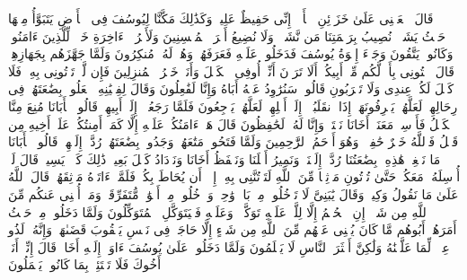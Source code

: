 \startbuffer[\q:12:55]
قَالَ ٱجۡعَلۡنِی عَلَىٰ خَزَاۤئِنِ ٱلۡأَرۡضِۖ إِنِّی حَفِیظٌ عَلِیمࣱ%
\stopbuffer
\startbuffer[\q:12:56]
وَكَذَٰلِكَ مَكَّنَّا لِیُوسُفَ فِی ٱلۡأَرۡضِ یَتَبَوَّأُ مِنۡهَا حَیۡثُ یَشَاۤءُۚ نُصِیبُ بِرَحۡمَتِنَا مَن نَّشَاۤءُۖ وَلَا نُضِیعُ أَجۡرَ ٱلۡمُحۡسِنِینَ%
\stopbuffer
\startbuffer[\q:12:57]
وَلَأَجۡرُ ٱلۡءَاخِرَةِ خَیۡرࣱ لِّلَّذِینَ ءَامَنُوا۟ وَكَانُوا۟ یَتَّقُونَ%
\stopbuffer
\startbuffer[\q:12:58]
وَجَاۤءَ إِخۡوَةُ یُوسُفَ فَدَخَلُوا۟ عَلَیۡهِ فَعَرَفَهُمۡ وَهُمۡ لَهُۥ مُنكِرُونَ%
\stopbuffer
\startbuffer[\q:12:59]
وَلَمَّا جَهَّزَهُم بِجَهَازِهِمۡ قَالَ ٱئۡتُونِی بِأَخࣲ لَّكُم مِّنۡ أَبِیكُمۡۚ أَلَا تَرَوۡنَ أَنِّیۤ أُوفِی ٱلۡكَیۡلَ وَأَنَا۠ خَیۡرُ ٱلۡمُنزِلِینَ%
\stopbuffer
\startbuffer[\q:12:60]
فَإِن لَّمۡ تَأۡتُونِی بِهِۦ فَلَا كَیۡلَ لَكُمۡ عِندِی وَلَا تَقۡرَبُونِ%
\stopbuffer
\startbuffer[\q:12:61]
قَالُوا۟ سَنُرَٰوِدُ عَنۡهُ أَبَاهُ وَإِنَّا لَفَٰعِلُونَ%
\stopbuffer
\startbuffer[\q:12:62]
وَقَالَ لِفِتۡیَٰنِهِ ٱجۡعَلُوا۟ بِضَٰعَتَهُمۡ فِی رِحَالِهِمۡ لَعَلَّهُمۡ یَعۡرِفُونَهَاۤ إِذَا ٱنقَلَبُوۤا۟ إِلَىٰۤ أَهۡلِهِمۡ لَعَلَّهُمۡ یَرۡجِعُونَ%
\stopbuffer
\startbuffer[\q:12:63]
فَلَمَّا رَجَعُوۤا۟ إِلَىٰۤ أَبِیهِمۡ قَالُوا۟ یَٰۤأَبَانَا مُنِعَ مِنَّا ٱلۡكَیۡلُ فَأَرۡسِلۡ مَعَنَاۤ أَخَانَا نَكۡتَلۡ وَإِنَّا لَهُۥ لَحَٰفِظُونَ%
\stopbuffer
\startbuffer[\q:12:64]
قَالَ هَلۡ ءَامَنُكُمۡ عَلَیۡهِ إِلَّا كَمَاۤ أَمِنتُكُمۡ عَلَىٰۤ أَخِیهِ مِن قَبۡلُ فَٱللَّهُ خَیۡرٌ حَٰفِظࣰاۖ وَهُوَ أَرۡحَمُ ٱلرَّٰحِمِینَ%
\stopbuffer
\startbuffer[\q:12:65]
وَلَمَّا فَتَحُوا۟ مَتَٰعَهُمۡ وَجَدُوا۟ بِضَٰعَتَهُمۡ رُدَّتۡ إِلَیۡهِمۡۖ قَالُوا۟ یَٰۤأَبَانَا مَا نَبۡغِیۖ هَٰذِهِۦ بِضَٰعَتُنَا رُدَّتۡ إِلَیۡنَاۖ وَنَمِیرُ أَهۡلَنَا وَنَحۡفَظُ أَخَانَا وَنَزۡدَادُ كَیۡلَ بَعِیرࣲۖ ذَٰلِكَ كَیۡلࣱ یَسِیرࣱ%
\stopbuffer
\startbuffer[\q:12:66]
قَالَ لَنۡ أُرۡسِلَهُۥ مَعَكُمۡ حَتَّىٰ تُؤۡتُونِ مَوۡثِقࣰا مِّنَ ٱللَّهِ لَتَأۡتُنَّنِی بِهِۦۤ إِلَّاۤ أَن یُحَاطَ بِكُمۡۖ فَلَمَّاۤ ءَاتَوۡهُ مَوۡثِقَهُمۡ قَالَ ٱللَّهُ عَلَىٰ مَا نَقُولُ وَكِیلࣱ%
\stopbuffer
\startbuffer[\q:12:67]
وَقَالَ یَٰبَنِیَّ لَا تَدۡخُلُوا۟ مِنۢ بَابࣲ وَٰحِدࣲ وَٱدۡخُلُوا۟ مِنۡ أَبۡوَٰبࣲ مُّتَفَرِّقَةࣲۖ وَمَاۤ أُغۡنِی عَنكُم مِّنَ ٱللَّهِ مِن شَیۡءٍۖ إِنِ ٱلۡحُكۡمُ إِلَّا لِلَّهِۖ عَلَیۡهِ تَوَكَّلۡتُۖ وَعَلَیۡهِ فَلۡیَتَوَكَّلِ ٱلۡمُتَوَكِّلُونَ%
\stopbuffer
\startbuffer[\q:12:68]
وَلَمَّا دَخَلُوا۟ مِنۡ حَیۡثُ أَمَرَهُمۡ أَبُوهُم مَّا كَانَ یُغۡنِی عَنۡهُم مِّنَ ٱللَّهِ مِن شَیۡءٍ إِلَّا حَاجَةࣰ فِی نَفۡسِ یَعۡقُوبَ قَضَىٰهَاۚ وَإِنَّهُۥ لَذُو عِلۡمࣲ لِّمَا عَلَّمۡنَٰهُ وَلَٰكِنَّ أَكۡثَرَ ٱلنَّاسِ لَا یَعۡلَمُونَ%
\stopbuffer
\startbuffer[\q:12:69]
وَلَمَّا دَخَلُوا۟ عَلَىٰ یُوسُفَ ءَاوَىٰۤ إِلَیۡهِ أَخَاهُۖ قَالَ إِنِّیۤ أَنَا۠ أَخُوكَ فَلَا تَبۡتَئِسۡ بِمَا كَانُوا۟ یَعۡمَلُونَ%

